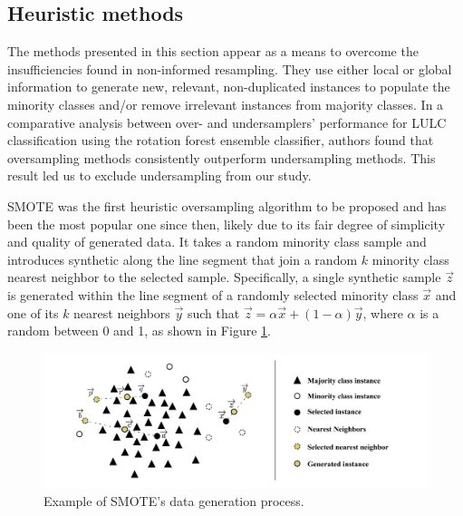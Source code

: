\documentclass[remotesensing,article,submit,moreauthors,pdftex]{Definitions/mdpi}
\begin{document}
\begin{paracol}{2}
\subsection{Heuristic methods}

The methods presented in this section appear as a means to overcome the
insufficiencies found in non-informed resampling. They use either local or
global information to generate new, relevant, non-duplicated instances to
populate the minority classes and/or remove irrelevant instances from majority
classes. In a comparative analysis between over- and undersamplers' performance
for LULC classification \cite{Feng2018} using the rotation forest ensemble
classifier, authors found that oversampling methods consistently outperform
undersampling methods. This result led us to exclude undersampling from our
study.

SMOTE \cite{Chawla2002} was the first heuristic oversampling algorithm to be
proposed and has been the most popular one since then, likely due to its fair
degree of simplicity and quality of generated data. It takes a random minority
class sample and introduces synthetic  along
the line segment that join a random $k$ minority class nearest neighbor to the
selected sample. Specifically, a single synthetic sample $\overrightarrow{z}$
is generated within the line segment of a randomly selected minority
class $\overrightarrow{x}$ and one of its
$k$ nearest neighbors $\overrightarrow{y}$ such that $\overrightarrow{z} =
\alpha\overrightarrow{x}+(1-\alpha)\overrightarrow{y}$, where $\alpha$ is a
random  between 0 and 1, as shown in
Figure \ref{fig:smote_example}.

\end{paracol}
\begin{figure}[H]
	\centering
    \captionsetup{justification=centering}
    \caption{Example of SMOTE's data generation process. 
    \vspace{.2cm}}
	\label{fig:smote_example}
	\includegraphics[width=1\linewidth]{../analysis/smote_example}
\end{figure}
\end{document}
